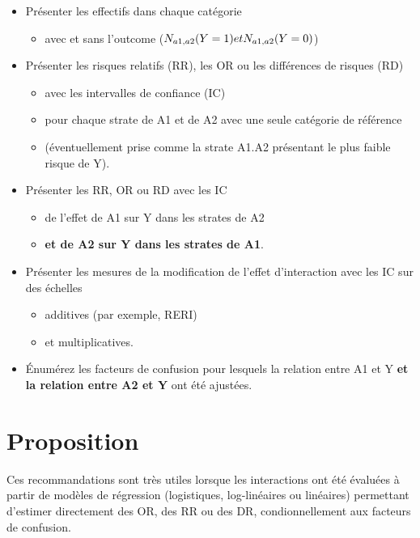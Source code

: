 \documentclass[
]{book}
\providecommand{\tightlist}{%
  \setlength{\itemsep}{0pt}\setlength{\parskip}{0pt}}
\begin{document}
\begin{itemize}
\tightlist
\item
  Présenter les effectifs dans chaque catégorie

  \begin{itemize}
  \tightlist
  \item
    avec et sans l'outcome (\(\small N_{a1,a2}(Y=1) et N_{a1,a2}(Y=0)\))
  \end{itemize}
\item
  Présenter les risques relatifs (RR), les OR ou les différences de risques (RD)

  \begin{itemize}
  \tightlist
  \item
    avec les intervalles de confiance (IC)
  \item
    pour chaque strate de A1 et de A2 avec une seule catégorie de référence
  \item
    (éventuellement prise comme la strate A1.A2 présentant le plus faible risque de Y).
  \end{itemize}
\item
  Présenter les RR, OR ou RD avec les IC

  \begin{itemize}
  \tightlist
  \item
    de l'effet de A1 sur Y dans les strates de A2
  \item
    \textbf{et de A2 sur Y dans les strates de A1}.
  \end{itemize}
\item
  Présenter les mesures de la modification de l'effet d'interaction avec les IC sur des échelles

  \begin{itemize}
  \tightlist
  \item
    additives (par exemple, RERI)
  \item
    et multiplicatives.
  \end{itemize}
\item
  Énumérez les facteurs de confusion pour lesquels la relation entre A1 et Y \textbf{et la relation entre A2 et Y} ont été ajustées.
\end{itemize}

\hypertarget{proposition}{%
\section{Proposition}\label{proposition}}

Ces recommandations sont très utiles lorsque les interactions ont été évaluées à partir de modèles de régression (logistiques, log-linéaires ou linéaires) permettant d'estimer directement des OR, des RR ou des DR, condionnellement aux facteurs de confusion.
\end{document}
